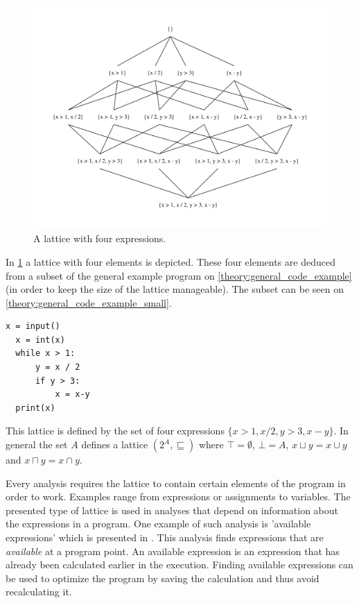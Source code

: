 \begin{figure}
\begin{center}
\includegraphics[width=\textwidth]{figures/dot_files/lattice_example.pdf}
\end{center}
\caption{A lattice with four expressions.}
\label{lattice_example}
\end{figure}

In \cref{lattice_example} a lattice with four elements is depicted.
These four elements are deduced from a subset of the general example program on \cref{theory:general_code_example}(in order to keep the size of the lattice manageable).
The subset can be seen on \cref{theory:general_code_example_small}.

\begin{lstlisting}[style=python, caption={The general code example used throughout the theory chapter.}, label={theory:general_code_example_small}]
  x = input()
  x = int(x)
  while x > 1:
      y = x / 2
      if y > 3:
          x = x-y
  print(x)
\end{lstlisting}

This lattice is defined by the set of four expressions $\{x > 1, x / 2, y > 3, x - y \}$.
In general the set $A$ defines a lattice $(2^A, \sqsubseteq )$ where $\top = \emptyset$, $\bot = A$, $x\sqcup y = x \cup y$ and $x \sqcap y = x \cap y$.

Every analysis requires the lattice to contain certain elements of the program in order to work.
Examples range from expressions or assignments to variables.
The presented type of lattice is used in analyses that depend on information about the expressions in a program.
One example of such analysis is 'available expressions' which is presented in \citet[p.~22]{schwartzbach}.
This analysis finds expressions that are \emph{available} at a program point.
An available expression is an expression that has already been calculated earlier in the execution.
Finding available expressions can be used to optimize the program by saving the calculation and thus avoid recalculating it.



